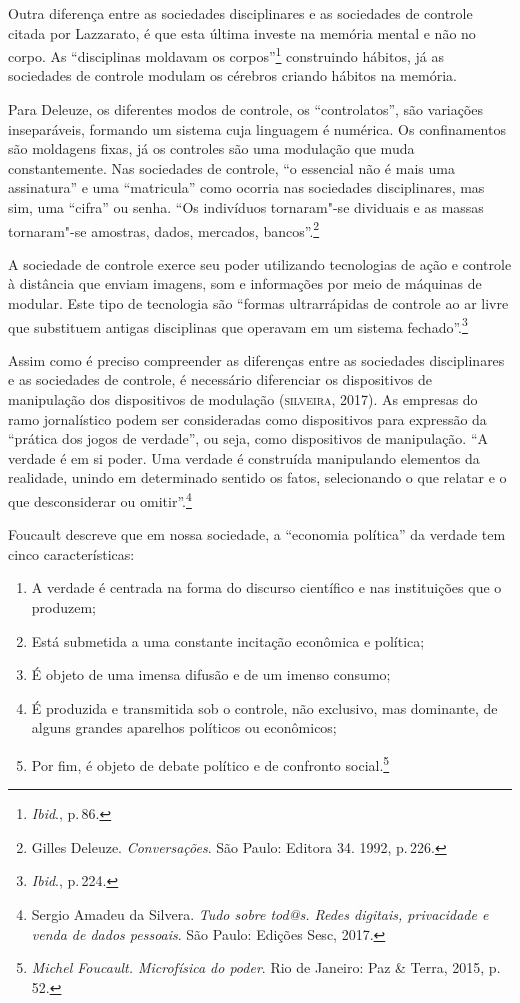 Outra diferença entre as sociedades disciplinares e as sociedades de
controle citada por Lazzarato, é que esta última investe na
memória mental e não no corpo. As ``disciplinas moldavam os corpos''\footnote{\textit{Ibid}., p.\,86.} construindo hábitos, já as sociedades de controle modulam os
cérebros criando hábitos na memória.

Para Deleuze, os diferentes modos de controle, os
``controlatos'', são variações inseparáveis, formando um sistema cuja
linguagem é numérica. Os confinamentos são moldagens fixas, já os
controles são uma modulação que muda constantemente. Nas sociedades de
controle, ``o essencial não é mais uma assinatura'' e uma ``matricula''
como ocorria nas sociedades disciplinares, mas sim, uma ``cifra'' ou
senha. ``Os indivíduos tornaram"-se dividuais e as massas tornaram"-se
amostras, dados, mercados, bancos''.\footnote{Gilles Deleuze. \emph{Conversações}. São Paulo: Editora 34. 1992, p.\,226.}

A sociedade de controle exerce seu poder utilizando tecnologias de ação
e controle à distância que enviam imagens, som e informações por meio de
máquinas de modular. Este tipo de tecnologia são ``formas ultrarrápidas
de controle ao ar livre que substituem antigas disciplinas que operavam
em um sistema fechado''.\footnote{\textit{Ibid}., p.\,224.}

Assim como é preciso compreender as diferenças entre as sociedades
disciplinares e as sociedades de controle, é necessário diferenciar os
dispositivos de manipulação dos dispositivos de modulação (\textsc{silveira},
2017). As empresas do ramo jornalístico podem ser consideradas como
dispositivos para expressão da ``prática dos jogos de verdade'', ou
seja, como dispositivos de manipulação. ``A verdade é em si poder. Uma
verdade é construída manipulando elementos da realidade, unindo em
determinado sentido os fatos, selecionando o que relatar e o que
desconsiderar ou omitir''.\footnote{Sergio Amadeu da Silvera. \emph{Tudo sobre tod@s. Redes digitais, privacidade e venda de dados pessoais}. São Paulo: Edições Sesc, 2017.}

Foucault descreve que em nossa sociedade, a ``economia política''
da verdade tem cinco características: 

\begin{enumerate}
\item A verdade é centrada na forma
do discurso científico e nas instituições que o produzem; 

\item Está submetida a uma constante incitação econômica e política;

\item É objeto de uma imensa difusão e de um imenso consumo; 

\item É produzida e transmitida sob o controle, não exclusivo, mas dominante, de alguns grandes aparelhos políticos ou econômicos; 

\item Por fim, é objeto de debate político e de confronto social.\footnote{\emph{Michel Foucault. Microfísica do poder}. Rio de Janeiro: Paz \& Terra, 2015, p.\,52.}
\end{enumerate}

